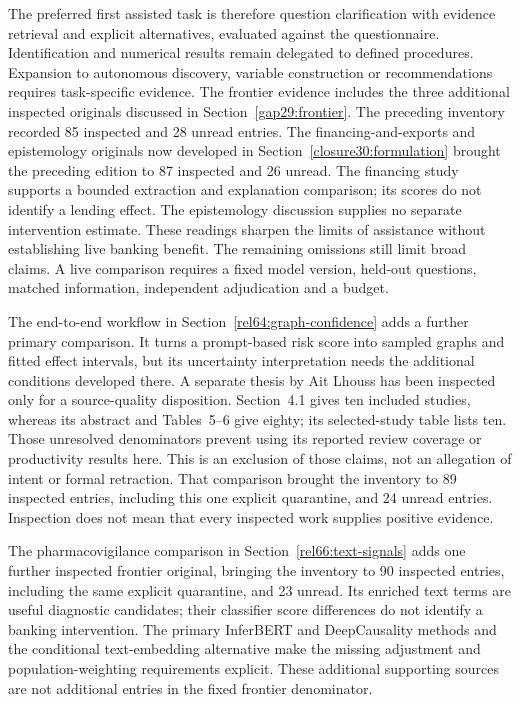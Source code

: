 The preferred first assisted task is therefore question clarification
with evidence retrieval and explicit alternatives, evaluated against
the questionnaire. Identification and numerical results remain delegated
to defined procedures. Expansion to autonomous discovery, variable
construction or recommendations requires task-specific evidence. The
frontier evidence includes the three additional inspected originals discussed
in Section~\ref{gap29:frontier}. The preceding inventory recorded 85 inspected
and 28 unread entries. The financing-and-exports and epistemology originals
now developed in Section~\ref{closure30:formulation} brought the preceding edition to
87 inspected and 26 unread. The financing study supports a bounded extraction
and explanation comparison; its scores do not identify a lending effect.
The epistemology discussion supplies no separate intervention estimate. These
readings sharpen the limits of assistance without establishing live banking
benefit. The remaining omissions still limit broad claims. A live comparison
requires a fixed model version, held-out questions, matched information,
independent adjudication and a budget.~\citep{rel18li,rel18mugleston}

The end-to-end workflow in Section~\ref{rel64:graph-confidence} adds a
further primary comparison. It turns a prompt-based risk score into sampled
graphs and fitted effect intervals, but its uncertainty interpretation needs
the additional conditions developed there. A separate thesis by Ait Lhouss
has been inspected only for a source-quality disposition. Section~4.1 gives
ten included studies, whereas its abstract and Tables~5--6 give eighty; its
selected-study table lists ten. Those unresolved denominators prevent using
its reported review coverage or productivity results here. This is an
exclusion of those claims, not an allegation of intent or formal retraction.
That comparison brought the inventory to 89 inspected entries, including
this one explicit quarantine, and 24 unread entries. Inspection does not
mean that every inspected work supplies positive evidence. \citep{rel64molero,rel64aitlhouss}

The pharmacovigilance comparison in Section~\ref{rel66:text-signals}
adds one further inspected frontier original, bringing the inventory to
90 inspected entries, including the same explicit quarantine, and 23 unread.
Its enriched text terms are useful diagnostic candidates; their classifier
score differences do not identify a banking intervention. The primary
InferBERT and DeepCausality methods and the conditional text-embedding
alternative make the missing adjustment and population-weighting requirements
explicit. These additional supporting sources are not additional entries in
the fixed frontier denominator. \citep{rel66pharma,rel66inferbert,rel66deepcausality,rel66veitch}





